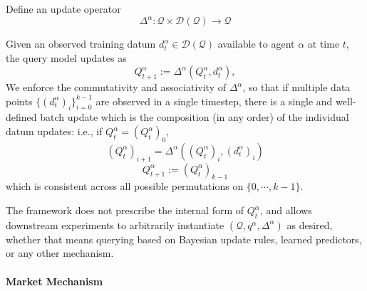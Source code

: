\documentclass[letterpaper]{article} %
\begin{document}
Define an update operator
\[
\Delta^\alpha : \mathcal{Q}\times \mathcal{D}(\mathcal{Q}) \to \mathcal{Q}
\]

Given an observed training datum $d_t^\alpha\in\mathcal{D}(\mathcal{Q})$ available to agent $\alpha$ at time $t$, the query model updates as
\[
Q_{t+1}^\alpha :=\Delta^\alpha(Q_t^\alpha, d_t^\alpha),
\]
We enforce the commutativity and associativity of $\Delta^\alpha$, so that if multiple data points $\{(d_t^\alpha)_i\}_{i=0}^{k-1}$ are observed in a single timestep, there is a single and well-defined batch update which is the composition (in any order) of the individual datum updates: i.e., if $Q_t^\alpha=(Q_t^\alpha)_0$,  
\[
(Q_{t}^\alpha)_{i+1} = \Delta^\alpha((Q_t^\alpha)_i, (d_t^\alpha)_i)
\]
\[Q_{t+1}^\alpha := (Q_{t}^\alpha)_{k-1}\]
which is consistent across all possible permutations on $\{0,\cdots,k-1\}$.



The framework does not prescribe the internal form of $Q_t^\alpha$, and allows downstream experiments to arbitrarily instantiate $(\mathcal{Q}, q^\alpha, \Delta^\alpha)$ as desired, whether that means querying based on Bayesian update rules, learned predictors, or any other mechanism.

\paragraph{Market Mechanism}
\label{sec:vamp-market}
\end{document}
